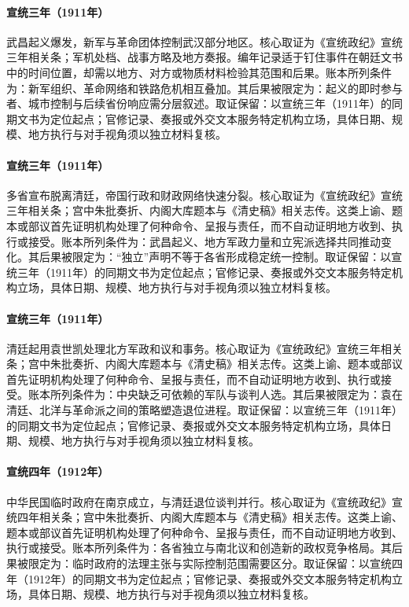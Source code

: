 \hypertarget{ledger:EQ-1911-WUCHANG-UPRISING}{}\paragraph{宣统三年（1911年）}武昌起义爆发，新军与革命团体控制武汉部分地区。核心取证为《宣统政纪》宣统三年相关条；军机处档、战事方略及地方奏报。编年记录适于钉住事件在朝廷文书中的时间位置，却需以地方、对方或物质材料检验其范围和后果。账本所列条件为：新军组织、革命网络和铁路危机相互叠加。其后果被限定为：起义的即时参与者、城市控制与后续省份响应需分层叙述。取证保留：以宣统三年（1911年）的同期文书为定位起点；官修记录、奏报或外交文本服务特定机构立场，具体日期、规模、地方执行与对手视角须以独立材料复核。
\hypertarget{ledger:EQ-1911-PROVINCIAL-INDEPENDENCE}{}\paragraph{宣统三年（1911年）}多省宣布脱离清廷，帝国行政和财政网络快速分裂。核心取证为《宣统政纪》宣统三年相关条；宫中朱批奏折、内阁大库题本与《清史稿》相关志传。这类上谕、题本或部议首先证明机构处理了何种命令、呈报与责任，而不自动证明地方收到、执行或接受。账本所列条件为：武昌起义、地方军政力量和立宪派选择共同推动变化。其后果被限定为：“独立”声明不等于各省形成稳定统一控制。取证保留：以宣统三年（1911年）的同期文书为定位起点；官修记录、奏报或外交文本服务特定机构立场，具体日期、规模、地方执行与对手视角须以独立材料复核。
\hypertarget{ledger:EQ-1911-YUAN-SHIKAI-RETURN}{}\paragraph{宣统三年（1911年）}清廷起用袁世凯处理北方军政和议和事务。核心取证为《宣统政纪》宣统三年相关条；宫中朱批奏折、内阁大库题本与《清史稿》相关志传。这类上谕、题本或部议首先证明机构处理了何种命令、呈报与责任，而不自动证明地方收到、执行或接受。账本所列条件为：中央缺乏可依赖的军队与谈判人选。其后果被限定为：袁在清廷、北洋与革命派之间的策略塑造退位进程。取证保留：以宣统三年（1911年）的同期文书为定位起点；官修记录、奏报或外交文本服务特定机构立场，具体日期、规模、地方执行与对手视角须以独立材料复核。
\hypertarget{ledger:EQ-1912-REPUBLIC-FOUNDING}{}\paragraph{宣统四年（1912年）}中华民国临时政府在南京成立，与清廷退位谈判并行。核心取证为《宣统政纪》宣统四年相关条；宫中朱批奏折、内阁大库题本与《清史稿》相关志传。这类上谕、题本或部议首先证明机构处理了何种命令、呈报与责任，而不自动证明地方收到、执行或接受。账本所列条件为：各省独立与南北议和创造新的政权竞争格局。其后果被限定为：临时政府的法理主张与实际控制范围需要区分。取证保留：以宣统四年（1912年）的同期文书为定位起点；官修记录、奏报或外交文本服务特定机构立场，具体日期、规模、地方执行与对手视角须以独立材料复核。
